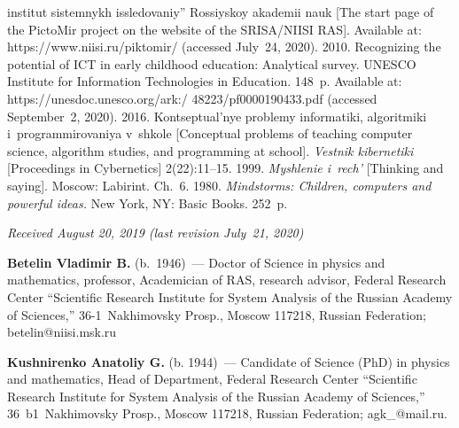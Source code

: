 \begin{multicols}{2}
{{\begin{thebibliography}{9}
\noindent
 institut sistemnykh issledovaniy'' Rossiyskoy akademii nauk [The start page of 
the PictoMir project on the website of the SRISA/NIISI RAS]. Available at: {\sf 
https://www.niisi.ru/piktomir/} (accessed July~24, 2020).
 2010.
Recognizing the potential of ICT in early childhood education: Analytical survey.
\mbox{UNESCO} Institute for Information Technologies in Education. 148~p. 
Available at: {\sf 
https://unesdoc.unesco.org/ark:/ 48223/pf0000190433.pdf} 
(accessed September~2, 2020).
 2016. Kontseptual'nye problemy informatiki, algoritmiki i~programmirovaniya 
v~shkole [Conceptual problems of teaching
 computer science, algorithm studies, and programming at school]. 
\textit{Vestnik kibernetiki} [Proceedings in Cybernetics] 2(22):11--15.
 1999. \textit{Myshlenie i~rech'}  
[Thinking and saying]. Moscow: Labirint. Ch.~6. 
 1980. \textit{Mindstorms: Children, computers and powerful 
ideas.} New York, NY: Basic 
Books. 252~p.
\end{thebibliography}

 }
 }

\end{multicols}

\vspace*{-6pt}

\hfill{\small\textit{Received August 20, 2019 (last revision July~21, 2020)}}




\Contr

\noindent
\textbf{Betelin Vladimir B.} (b.\ 1946)~--- 
Doctor of Science in physics and mathematics, professor, Academician of 
RAS, research advisor, Federal Research Center 
``Scientific Research Institute for System Analysis of the 
Russian Academy of Sciences,'' 36-1~Nakhimovsky Prosp., Moscow 117218, Russian Federation; 
\mbox{betelin@niisi.msk.ru}

\vspace*{3pt}

\noindent
\textbf{Kushnirenko Anatoliy G.} (b. 1944)~--- Candidate of Science (PhD) in 
physics and mathematics, Head of 
Department, Federal Research Center 
``Scientific Research Institute for System Analysis of the Russian 
Academy of Sciences,'' 36~b1~Nakhimovsky Prosp., Moscow 117218, Russian Federation; agk\_@mail.ru.

